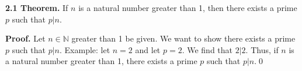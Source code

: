 \documentclass[12pt]{article}
\begin{document}
\noindent\textbf{2.1 Theorem.} If $n$ is a natural number greater than 1, then there exists a prime $p$ such that $p|n$.

\bigskip

\noindent\textbf{Proof.} Let $n\in\mathbb{N}$ greater than 1 be given. We want to show there exists a prime $p$ such that $p|n$. Example: let $n=2$ and let $p=2$. We find that $2|2$. Thus, if $n$ is a natural number greater than 1, there exists a prime $p$ such that $p|n$.\qed
\end{document}
